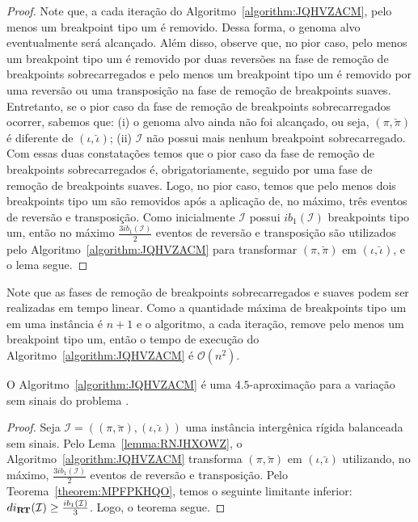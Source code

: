 \begin{proof}
Note que, a cada iteração do Algoritmo~\ref{algorithm:JQHVZACM}, pelo menos um breakpoint tipo um é removido. Dessa forma, o genoma alvo eventualmente será alcançado. Além disso, observe que, no pior caso, pelo menos um breakpoint tipo um é removido por duas reversões na fase de remoção de breakpoints sobrecarregados e pelo menos um breakpoint tipo um é removido por uma reversão ou uma transposição na fase de remoção de breakpoints suaves. Entretanto, se o pior caso da fase de remoção de breakpoints sobrecarregados ocorrer, sabemos que: (i) o genoma alvo ainda não foi alcançado, ou seja, $(\pi,\breve\pi)$ é diferente de $(\iota,\breve\iota)$; (ii) $\mathcal{I}$ não possui mais nenhum breakpoint sobrecarregado. Com essas duas constatações temos que o pior caso da fase de remoção de breakpoints sobrecarregados é, obrigatoriamente, seguido por uma fase de remoção de breakpoints suaves. Logo, no pior caso, temos que pelo menos dois breakpoints tipo um são removidos após a aplicação de, no máximo, três eventos de reversão e transposição. Como inicialmente $\mathcal{I}$ possui $ib_1(\mathcal{I})$ breakpoints tipo um, então no máximo $\frac{3ib_1(\mathcal{I})}{2}$ eventos de reversão e transposição são utilizados pelo Algoritmo~\ref{algorithm:JQHVZACM} para transformar $(\pi,\breve\pi)$ em $(\iota,\breve\iota)$, e o lema segue.
\end{proof}

Note que as fases de remoção de breakpoints sobrecarregados e suaves podem ser realizadas em tempo linear. Como a quantidade máxima de breakpoints tipo um em uma instância é $n+1$ e o algoritmo, a cada iteração, remove pelo menos um breakpoint tipo um, então o tempo de execução do Algoritmo~\ref{algorithm:JQHVZACM} é $\mathcal{O}(n^2)$.

\begin{theorem}\label{theorem:QKJNIMOI}
O Algoritmo~\ref{algorithm:JQHVZACM} é uma $4.5$-aproximação para a variação sem sinais do problema \SbIRT{}.
\end{theorem}
\begin{proof}
Seja $\mathcal{I} = ((\pi,\breve\pi),(\iota,\breve\iota))$ uma instância intergênica rígida balanceada sem sinais. Pelo Lema~\ref{lemma:RNJHXOWZ}, o Algoritmo~\ref{algorithm:JQHVZACM} transforma $(\pi,\breve\pi)$ em $(\iota,\breve\iota)$ utilizando, no máximo, $\frac{3ib_1(\mathcal{I})}{2}$ eventos de reversão e transposição. Pelo Teorema~\ref{theorem:MPFPKHQO}, temos o seguinte limitante inferior: $di_{\textbf{RT}}(\mathcal{I}) \ge \frac{ib_1(\mathcal{I})}{3}$. Logo, o teorema segue. 
\end{proof}

